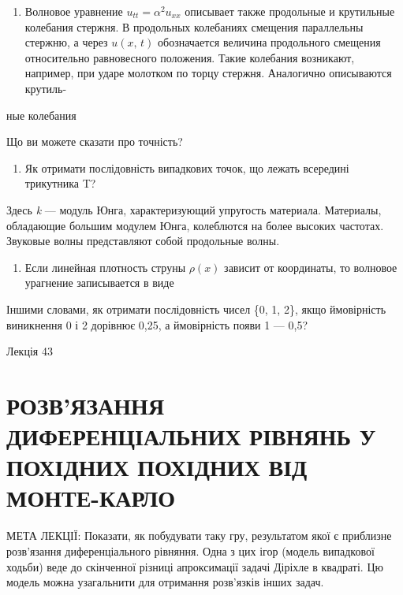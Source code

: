 \documentclass[
  ukrainian,
]{article}
\providecommand{\tightlist}{%
  \setlength{\itemsep}{0pt}\setlength{\parskip}{0pt}}
\begin{document}
\begin{enumerate}
\def\labelenumi{\arabic{enumi}.}
\tightlist
\item
  Волновое уравнение \(u_{tt} = \alpha^2 u_{xx}\) описывает также
  продольные и крутильные колебания стержня. В продольных колебаниях
  смещения параллельны стержню, а через \(u\left(x,\,t\right)\)
  обозначается величина продольного смещения относительно равновесного
  положения. Такие колебания возникают, например, при ударе молотком по
  торцу стержня. Аналогично описываются крутиль-
\end{enumerate}

ные колебания

Що ви можете сказати про точність?

\begin{enumerate}
\def\labelenumi{\arabic{enumi}.}
\setcounter{enumi}{3}
\tightlist
\item
  Як отримати послідовність випадкових точок, що лежать всередині
  трикутника T?
\end{enumerate}

Здесь \emph{k} --- модуль Юнга, характеризующий упругость материала.
Материалы, обладающие большим модулем Юнга, колеблются на более высоких
частотах. Звуковые волны представляют собой продольные волны.

\begin{enumerate}
\def\labelenumi{\arabic{enumi}.}
\setcounter{enumi}{1}
\tightlist
\item
  Если линейная плотность струны \(\rho(x)\) зависит от координаты, то
  волновое урагнение записывается в виде
\end{enumerate}

Іншими словами, як отримати послідовність чисел \{0, 1, 2\}, якщо
ймовірність виникнення 0 і 2 дорівнює 0,25, а ймовірність появи 1 ---
0,5?

Лекція 43

\section{РОЗВ'ЯЗАННЯ ДИФЕРЕНЦІАЛЬНИХ РІВНЯНЬ У ПОХІДНИХ ПОХІДНИХ ВІД
МОНТЕ-КАРЛО}\label{ux440ux43eux437ux432ux44fux437ux430ux43dux43dux44f-ux434ux438ux444ux435ux440ux435ux43dux446ux456ux430ux43bux44cux43dux438ux445-ux440ux456ux432ux43dux44fux43dux44c-ux443-ux43fux43eux445ux456ux434ux43dux438ux445-ux43fux43eux445ux456ux434ux43dux438ux445-ux432ux456ux434-ux43cux43eux43dux442ux435-ux43aux430ux440ux43bux43e}

МЕТА ЛЕКЦІЇ: Показати, як побудувати таку гру, результатом якої є
приблизне розв'язання диференціального рівняння. Одна з цих ігор (модель
випадкової ходьби) веде до скінченної різниці апроксимації задачі
Діріхле в квадраті. Цю модель можна узагальнити для отримання розв'язків
інших задач.
\end{document}

